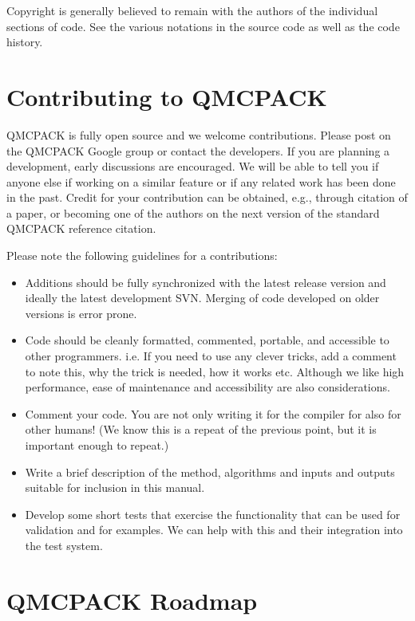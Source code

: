 Copyright is generally believed to remain with the authors of the
individual sections of code. See the various notations in the source code as
well as the code history.

\section{Contributing to QMCPACK}
\label{sec:contributing}

QMCPACK is fully open source and we welcome contributions.  Please
post on the QMCPACK Google group or contact the developers. If you are
planning a development, early discussions are encouraged. We will be
able to tell you if anyone else if working on a similar feature or if
any related work has been done in the past.  Credit for your
contribution can be obtained, e.g., through citation of a paper, or
becoming one of the authors on the next version of the standard
QMCPACK reference citation.

Please note the following guidelines for a contributions:
\begin{itemize}
\item Additions should be fully synchronized with the latest release
  version and ideally the latest  development SVN. Merging of code
  developed on older versions is error prone.
\item Code should be cleanly formatted, commented, portable, and accessible to
  other programmers. i.e. If you need to use any clever tricks, add a comment
  to note this, why the trick is needed, how it works etc. Although we like
  high performance, ease of maintenance and accessibility are also
  considerations.
\item Comment your code. You are not only writing it for the compiler
  for also for other humans! (We know this is a repeat of the previous
  point, but it is important enough to repeat.)
\item Write a brief description of the method, algorithms and inputs and outputs
  suitable for inclusion in this manual.
\item Develop some short tests that exercise the
  functionality that can be used for validation and for examples. We
  can help with this and their integration into the test system.
\end{itemize}

\section{QMCPACK Roadmap}
\label{sec:roadmap}

